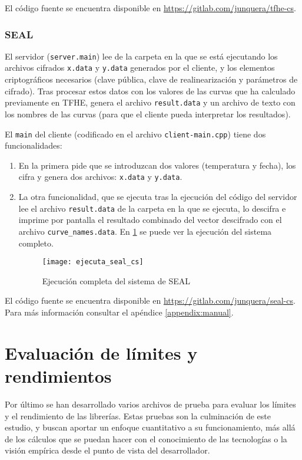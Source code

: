 El código fuente se encuentra disponible en \url{https://gitlab.com/junquera/tfhe-cs}.

\subsubsection{SEAL}


El servidor (\verb|server.main|) lee de la carpeta en la que se está ejecutando los archivos cifrados \verb|x.data| y \verb|y.data| generados por el cliente, y los elementos criptográficos necesarios (clave pública, clave de realinearización y parámetros de cifrado). Tras procesar estos datos con los valores de las curvas que ha calculado previamente en TFHE, genera el archivo \verb|result.data| y un archivo de texto con los nombres de las curvas (para que el cliente pueda interpretar los resultados).

El \verb|main| del cliente (codificado en el archivo \verb|client-main.cpp|) tiene dos funcionalidades:
\begin{enumerate}
    \item En la primera pide que se introduzcan dos valores (temperatura y fecha), los cifra y genera dos archivos: \verb|x.data| y \verb|y.data|.

    \item La otra funcionalidad, que se ejecuta tras la ejecución del código del servidor lee el archivo  \verb|result.data| de la carpeta en la que se ejecuta, lo descifra e imprime por pantalla el resultado combinado del vector descifrado con el archivo \verb|curve_names.data|. En \ref{fig:ejecuta_seal_cs} se puede ver la ejecución del sistema completo.

  \begin{figure}[h]
    \centering
    \texttt{[image: ejecuta\_seal\_cs]}
    \caption{Ejecución completa del sistema de SEAL} \label{fig:ejecuta_seal_cs}
  \end{figure}
\end{enumerate}

El código fuente se encuentra disponible en \url{https://gitlab.com/junquera/seal-cs}. Para más información consultar el apéndice \ref{appendix:manual}.

\section{Evaluación de límites y rendimientos}

Por último se han desarrollado varios archivos de prueba para evaluar los límites y el rendimiento de las librerías. Estas pruebas son la culminación de este estudio, y buscan aportar un enfoque cuantitativo a su funcionamiento, más allá de los cálculos que se puedan hacer con el conocimiento de las tecnologías o la visión empírica desde el punto de vista del desarrollador.


